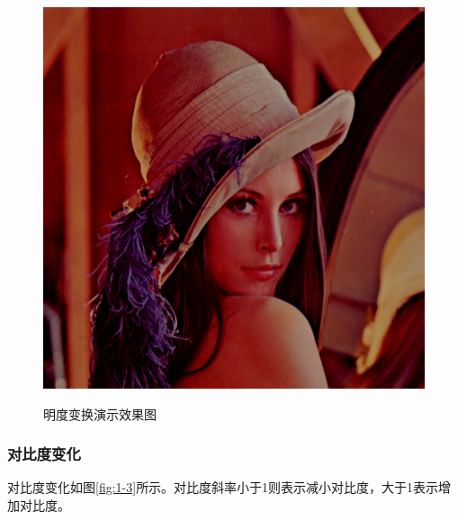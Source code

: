 \documentclass[a4paper]{article}
\begin{document}
\begin{figure}[htp]
{\begin{minipage}[b]{0.45\columnwidth}
{\includegraphics[width=1\columnwidth]{1_3.png}
}
\label{fig:1-2:b}
\end{minipage}
}
\caption{明度变换演示效果图}
\label{fig:1-2}
\end{figure}

\subsubsection{对比度变化}

对比度变化如图\ref{fig:1-3}所示。对比度斜率小于1则表示减小对比度，大于1表示增加对比度。
\end{document}
